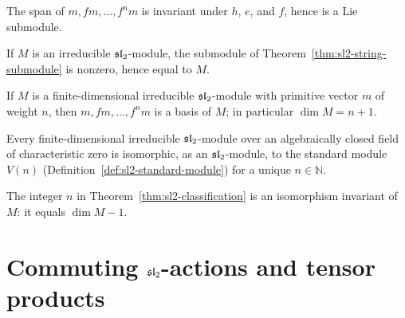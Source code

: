 \begin{theorem}
  \label{thm:sl2-string-submodule}
  \leanok
  The span of $m, fm, \dots, f^n m$ is invariant under $h$, $e$, and $f$,
  hence is a Lie submodule.
\end{theorem}

\begin{theorem}
  \label{thm:sl2-irreducible-spans}
  \leanok
  If $M$ is an irreducible $\mathfrak{sl}_2$-module, the submodule of
  Theorem~\ref{thm:sl2-string-submodule} is nonzero, hence equal to $M$.
\end{theorem}

\begin{theorem}
  \label{thm:sl2-basis-theorem}
  \leanok
  If $M$ is a finite-dimensional irreducible $\mathfrak{sl}_2$-module with primitive
  vector $m$ of weight $n$, then $m, fm, \dots, f^n m$ is a basis of $M$; in
  particular $\dim M = n+1$.
\end{theorem}

\begin{theorem}
  \label{thm:sl2-classification}
  \leanok
  Every finite-dimensional irreducible $\mathfrak{sl}_2$-module over an algebraically
  closed field of characteristic zero is isomorphic, as an $\mathfrak{sl}_2$-module,
  to the standard module $V(n)$ (Definition~\ref{def:sl2-standard-module})
  for a unique $n \in \mathbb{N}$.
\end{theorem}

\begin{theorem}
  \label{thm:sl2-uniqueness-hw}
  \leanok
  The integer $n$ in Theorem~\ref{thm:sl2-classification} is an isomorphism
  invariant of $M$: it equals $\dim M - 1$.
\end{theorem}

\section{Commuting $\mathfrak{sl}_2$-actions and tensor products}
\label{sec:sl2-commuting}

